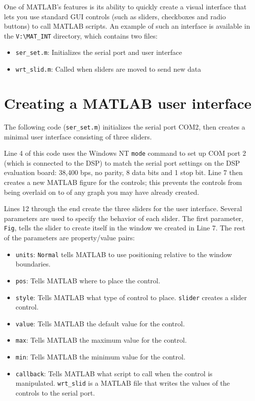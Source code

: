 One of MATLAB's features is its ability to quickly create a visual interface
that lets you use standard GUI controls (such as sliders, checkboxes and
radio buttons) to call MATLAB scripts. An example of such an interface is 
available in the \verb+V:\MAT_INT+ directory, which contains two files:
\begin{itemize}
  \item{\verb+ser_set.m+: Initializes the serial port and user interface}
  \item{\verb+wrt_slid.m+: Called when sliders are moved to send new data}
\end{itemize}

\section{Creating a MATLAB user interface}

The following code (\verb+ser_set.m+) initializes the serial port COM2, then
creates a minimal user interface consisting of three sliders.

\setlength{\baselineskip}{0.4cm}
\setlength{\baselineskip}{0.5cm}

Line 4 of this code uses the Windows NT \verb+mode+ command to set up
COM port 2 (which is connected to the DSP) to match the serial port 
settings on the DSP evaluation board: 38,400 bps, no parity, 8 data bits
 and 1 stop bit. Line 7 then creates a new MATLAB figure for the controls;
this prevents the controls from being overlaid on to of any graph you
may have already created. 

Lines 12 through the end create the three sliders for the user interface. 
Several parameters are used to specify the behavior of each slider. The
first parameter, \verb+Fig+, tells the slider to create itself in the 
window we created in Line 7. The rest of the parameters are property/value
pairs:

\begin{itemize}
  \item{\verb+units+: \verb+Normal+ tells MATLAB to use positioning relative 
        to the window boundaries.}
  \item{\verb+pos+: Tells MATLAB where to place the control.}
  \item{\verb+style+: Tells MATLAB what type of control to place. \verb+slider+
        creates a slider control.}
  \item{\verb+value+: Tells MATLAB the default value for the control.}
  \item{\verb+max+: Tells MATLAB the maximum value for the control.}
  \item{\verb+min+: Tells MATLAB the minimum value for the control.}
  \item{\verb+callback+: Tells MATLAB what script to call when the control is 
        manipulated. \verb+wrt_slid+ is a MATLAB file that writes the values of
        the controls to the serial port.}
\end{itemize}

